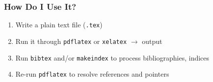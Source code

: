 \begin{frame}
\frametitle{How Do I Use It?}
\begin{enumerate}
\item<+-> Write a plain text  file (\texttt{.tex})
\item<+-> Run it through \texttt{pdflatex} or \texttt{xelatex} $\rightarrow$  output\\
\item<+-> Run \texttt{bibtex} and/or \texttt{makeindex} to process bibliographies, indices
\item<+-> Re-run \texttt{pdflatex} to resolve references and pointers
\end{enumerate}
\end{frame}

